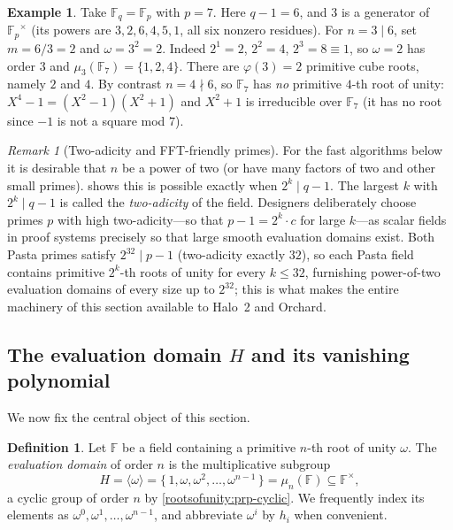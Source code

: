 \documentclass[11pt,a4paper]{article}
\theoremstyle{definition}
\newtheorem{definition}[theorem]{Definition}
\newtheorem{example}[theorem]{Example}
\theoremstyle{remark}
\newtheorem{remark}[theorem]{Remark}
\newcommand{\F}{\ensuremath{\mathbb{F}}}
\newcommand{\Fp}{\ensuremath{\mathbb{F}_{p}}}
\newcommand{\Fq}{\ensuremath{\mathbb{F}_{q}}}
\begin{document}
\begin{example}\label{rootsofunity:exp-f7}
Take \(\Fq = \Fp\) with \(p = 7\). Here \(q - 1 = 6\), and \(3\) is a generator of \(\Fp^\times\) (its powers are \(3,2,6,4,5,1\), all six nonzero residues). For \(n = 3 \mid 6\), set \(m = 6/3 = 2\) and \(\omega = 3^2 = 2\). Indeed \(2^1 = 2\), \(2^2 = 4\), \(2^3 = 8 \equiv 1\), so \(\omega = 2\) has order \(3\) and \(\mu_3(\F_7) = \{1, 2, 4\}\). There are \(\varphi(3) = 2\) primitive cube roots, namely \(2\) and \(4\). By contrast \(n = 4 \nmid 6\), so \(\F_7\) has \emph{no} primitive \(4\)-th root of unity: \(X^4 - 1 = (X^2-1)(X^2+1)\) and \(X^2 + 1\) is irreducible over \(\F_7\) (it has no root since \(-1\) is not a square mod \(7\)).
\end{example}

\begin{remark}[Two-adicity and FFT-friendly primes]\label{rootsofunity:rem-twoadic}
For the fast algorithms below it is desirable that \(n\) be a power of two (or have many factors of two and other small primes).  shows this is possible exactly when \(2^k \mid q-1\). The largest \(k\) with \(2^k \mid q-1\) is called the \emph{two-adicity} of the field. Designers deliberately choose primes \(p\) with high two-adicity---so that \(p - 1 = 2^k \cdot c\) for large \(k\)---as scalar fields in proof systems precisely so that large smooth evaluation domains exist. Both Pasta primes satisfy \(2^{32} \mid p - 1\) (two-adicity exactly \(32\)), so each Pasta field contains primitive \(2^k\)-th roots of unity for every \(k \le 32\), furnishing power-of-two evaluation domains of every size up to \(2^{32}\); this is what makes the entire machinery of this section available to Halo~2 and Orchard.
\end{remark}

\subsection{The evaluation domain \(H\) and its vanishing polynomial}

We now fix the central object of this section.

\begin{definition}\label{rootsofunity:def-domain}
Let \(\F\) be a field containing a primitive \(n\)-th root of unity \(\omega\). The \emph{evaluation domain} of order \(n\) is the multiplicative subgroup
\[
  H = \langle \omega \rangle = \{\,1, \omega, \omega^2, \dots, \omega^{n-1}\,\} = \mu_n(\F) \subseteq \F^\times,
\]
a cyclic group of order \(n\) by \cref{rootsofunity:prp-cyclic}. We frequently index its elements as \(\omega^0, \omega^1, \dots, \omega^{n-1}\), and abbreviate \(\omega^i\) by \(h_i\) when convenient.
\end{definition}
\end{document}
